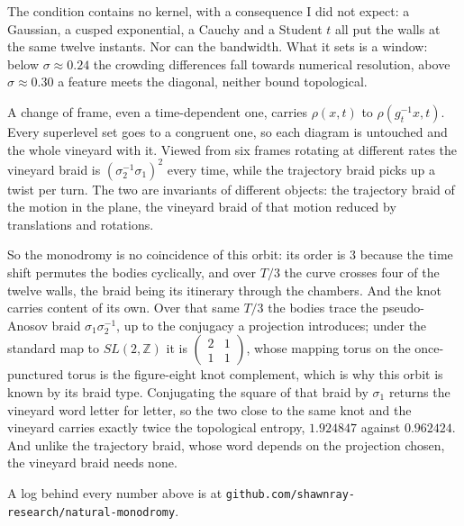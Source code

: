 \documentclass[11pt]{article}
\begin{document}
The condition contains no kernel, with a consequence I did not expect: a
Gaussian, a cusped exponential, a Cauchy and a Student $t$ all put the walls at
the same twelve instants. Nor can the bandwidth. What it sets is a window: below
$\sigma\approx0.24$ the crowding differences fall towards numerical resolution,
above $\sigma\approx0.30$ a feature meets the diagonal, neither bound
topological.

A change of frame, even a time-dependent one, carries $\rho(x,t)$ to
$\rho(g_t^{-1}x,t)$. Every superlevel set goes to a congruent one, so each
diagram is untouched and the whole vineyard with it. Viewed from six frames
rotating at different rates the vineyard braid is $(\sigma_2^{-1}\sigma_1)^2$
every time, while the trajectory braid picks up a twist per turn. The two are
invariants of different objects: the trajectory braid of the motion in the
plane, the vineyard braid of that motion reduced by translations and rotations.

So the monodromy is no coincidence of this orbit: its order is $3$ because the
time shift permutes the bodies cyclically, and over $T/3$ the curve crosses four
of the twelve walls, the braid being its itinerary through the chambers. And the
knot carries content of its own. Over that same $T/3$ the bodies trace the
pseudo-Anosov braid $\sigma_1\sigma_2^{-1}$, up to the conjugacy a projection
introduces; under the standard map to $SL(2,\mathbb{Z})$ it is
$\left(\begin{smallmatrix}2&1\\1&1\end{smallmatrix}\right)$, whose mapping torus
on the once-punctured torus is the figure-eight knot complement, which is why
this orbit is known by its braid type. Conjugating the square of that braid by
$\sigma_1$ returns the vineyard word letter for letter, so the two close to the
same knot and the vineyard carries exactly twice the topological entropy,
$1.924847$ against $0.962424$. And unlike the trajectory braid, whose word
depends on the projection chosen, the vineyard braid needs none.

\vspace{0.35em}
{\footnotesize A log behind every number above is at
\texttt{github.com/shawnray-research/natural-monodromy}.}
\end{document}
